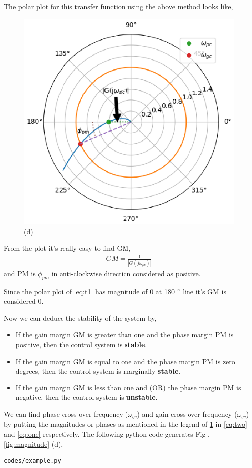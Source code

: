\begin{enumerate}[label=\thesection.\arabic*.,ref=\thesection.\theenumi]
The polar plot for this transfer function using the above method looks like,
\begin{figure}[!h]
    \includegraphics[width=\columnwidth]{./figs/ee18btech11028/example.eps}
  \caption{(d)}
  \label{fig:example1}
\end{figure}

From the plot it's really easy to find GM,
\begin{align}
    GM = \frac{1}{|G(j\omega_{pc})|}
\end{align}
and PM is $\phi_{pm}$ in anti-clockwise direction considered as positive.

Since the polar plot of \eqref{eq:t1} has magnitude of 0 at 180 $\degree$ line it's GM is considered 0.

Now we can deduce the stability of the system by,
\begin{itemize}
    \item If the gain margin GM is greater than one and the phase margin PM is positive, then the control system is \textbf{stable}.
    \item If the gain margin GM is equal to one and the phase margin PM is zero degrees, then the control system is marginally \textbf{stable}.
    \item If the gain margin GM is less than one and (OR) the phase margin PM is negative, then the control system is \textbf{unstable}.
\end{itemize}


We can find phase cross over frequency ($\omega_{gc}$) and gain cross over frequency ($\omega_{gc}$) by putting the magnitudes or phases as mentioned in the legend of \ref{fig:example1} in \eqref{eq:two}
and \eqref{eq:one} respectively.
The following python code generates  Fig . \ref{fig:magnitude} (d),
\begin{lstlisting}
codes/example.py
\end{lstlisting}


\end{enumerate}
